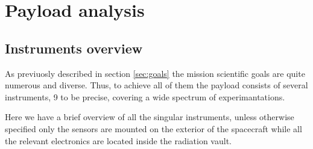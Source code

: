 \section{Payload analysis}
\label{sec:payload}

\subsection{Instruments overview}
As previuosly described in section \ref{sec:goals} the mission scientific goals are quite numerous and diverse. Thus, to achieve all of them the payload consists of several instruments, 9 to be precise, covering a wide spectrum of experimantations.


Here we have a brief overview of all the singular instruments, unless otherwise specified only the sensors are mounted on the exterior of the spacecraft while all the relevant electronics are located inside the radiation vault. 

